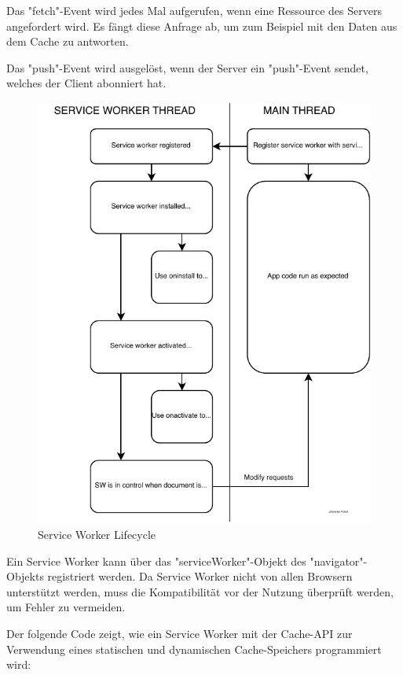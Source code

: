 
Das "fetch"-Event wird jedes Mal aufgerufen, wenn eine Ressource des Servers angefordert wird. Es fängt diese Anfrage ab, um zum Beispiel mit den Daten aus dem Cache zu antworten.


Das "push"-Event wird ausgelöst, wenn der Server ein "push"-Event sendet, welches der Client abonniert hat.

\begin{figure}[H]
    \centering
    \includegraphics{media/ServiceWorker/lifecycle.svg.pdf}
    \caption{Service Worker Lifecycle}
\end{figure}


Ein Service Worker kann über das "{\ttfamily serviceWorker}"-Objekt des "{\ttfamily navigator}"-Objekts registriert werden. 
Da Service Worker nicht von allen Browsern unterstützt werden, muss die Kompatibilität vor der Nutzung überprüft werden, um Fehler zu vermeiden.


\label{sec:cacheImpl}

Der folgende Code zeigt, wie ein Service Worker mit der Cache-API zur Verwendung eines statischen und dynamischen Cache-Speichers programmiert wird:

